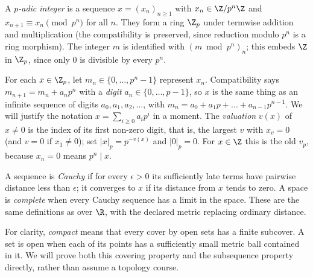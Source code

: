 \begin{definition}
A \emph{$p$-adic integer} is a sequence $x=(x_n)_{n\ge1}$ with $x_n\in\Z/p^n\Z$ and $x_{n+1}\equiv x_n\pmod{p^n}$ for all $n$. They form a ring $\Z_p$ under termwise addition and multiplication (the compatibility is preserved, since reduction modulo $p^n$ is a ring morphism). The integer $m$ is identified with $(m\bmod p^n)_n$; this embeds $\Z$ in $\Z_p$, since only $0$ is divisible by every $p^n$.
\end{definition}

For each $x\in\Z_p$, let $m_n\in\{0,\dots,p^n-1\}$ represent $x_n$. Compatibility says $m_{n+1}=m_n+a_np^n$ with a \emph{digit} $a_n\in\{0,\dots,p-1\}$, so $x$ is the same thing as an infinite sequence of digits $a_0,a_1,a_2,\dots$, with $m_n=a_0+a_1p+\dots+a_{n-1}p^{n-1}$. We will justify the notation $x=\sum_{i\ge0}a_ip^i$ in a moment. The \emph{valuation} $v(x)$ of $x\ne0$ is the index of its first non-zero digit, that is, the largest $v$ with $x_v=0$ (and $v=0$ if $x_1\ne0$); set $|x|_p=p^{-v(x)}$ and $|0|_p=0$. For $x\in\Z$ this is the old $v_p$, because $x_n=0$ means $p^n\mid x$.

A sequence is \emph{Cauchy} if for every $\epsilon>0$ its sufficiently
late terms have pairwise distance less than $\epsilon$; it converges to $x$
if its distance from $x$ tends to zero. A space is \emph{complete} when
every Cauchy sequence has a limit in the space. These are the same definitions
as over $\R$, with the declared metric replacing ordinary distance.

For clarity, \emph{compact} means that every cover by open sets has a finite
subcover. A set is open when each of its points has a sufficiently small
metric ball contained in it. We will prove both this covering property and
the subsequence property directly, rather than assume a topology course.

